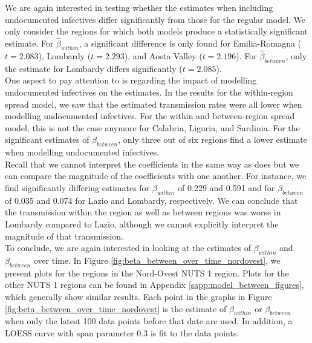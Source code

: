 \documentclass[12pt]{article}
\begin{document}
	We are again interested in testing whether the estimates when including undocumented infectives differ significantly from those for the regular model. We only consider the regions for which both models produce a statistically significant estimate. For $\widehat{\beta}_{within}$, a significant difference is only found for Emilia-Romagna ($t=2.083$), Lombardy ($t=2.293$), and Aosta Valley ($t=2.196$). For $\widehat{\beta}_{between}$, only the estimate for Lombardy differs significantly ($t=2.085$). \\
	
	One aspect to pay attention to is regarding the impact of modelling undocumented infectives on the estimates. In the results for the within-region spread model, we saw that the estimated transmission rates were all lower when modelling undocumented infectives. For the within and between-region spread model, this is not the case anymore for Calabria, Liguria, and Sardinia. For the significant estimates of $\beta_{between}$, only three out of six regions find a lower estimate when modelling undocumented infectives. \\
	
	Recall that we cannot interpret the coefficients in the same way as \textcite{adda2016economic} does but we can compare the magnitude of the coefficients with one another. For instance, we find significantly differing estimates for $\beta_{within}$ of 0.229 and 0.591 and for $\beta_{between}$ of 0.035 and 0.074 for Lazio and Lombardy, respectively. We can conclude that the transmission within the region as well as between regions was worse in Lombardy compared to Lazio, although we cannot explicitly interpret the magnitude of that transmission. \\
    
    To conclude, we are again interested in looking at the estimates of $\beta_{within}$ and $\beta_{between}$ over time. In Figure \ref{fig:beta_between_over_time_nordovest}, we present plots for the regions in the Nord-Ovest NUTS 1 region. Plots for the other NUTS 1 regions can be found in Appendix \ref{sapp:model_between_figures}, which generally show similar results. Each point in the graphs in Figure \ref{fig:beta_between_over_time_nordovest} is the estimate of $\beta_{within}$ or $\beta_{between}$ when only the latest 100 data points before that date are used. In addition, a LOESS curve with span parameter 0.3 is fit to the data points.
    
\end{document}
